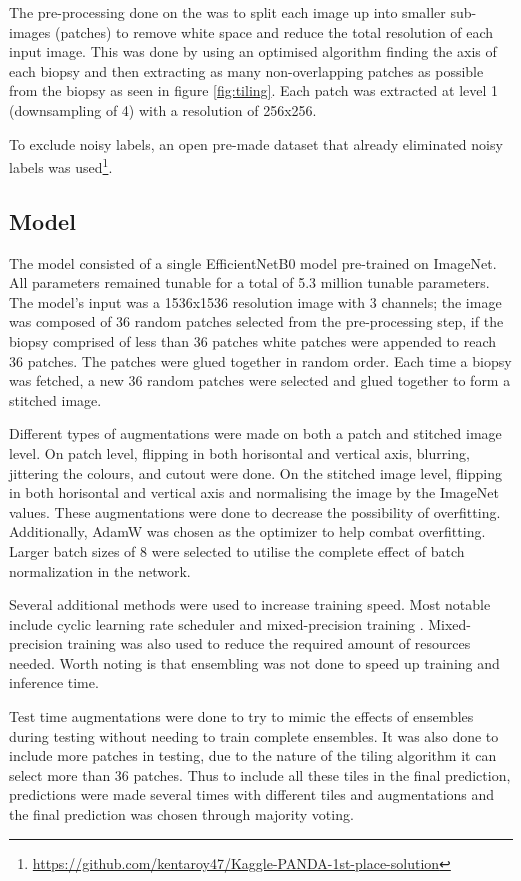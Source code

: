 \documentclass{mod-comjnl}
\begin{document}
The pre-processing done on the  was to split each image up into smaller sub-images (patches) to remove white space and reduce the total resolution of each input image. This was done by using an optimised algorithm finding the axis of each biopsy and then extracting as many non-overlapping patches as possible from the biopsy as seen in figure \ref{fig:tiling}. Each patch was extracted at level 1 (downsampling of 4) with a resolution of 256x256.

To exclude noisy labels, an open pre-made dataset that already eliminated noisy labels was used\footnote{\url{https://github.com/kentaroy47/Kaggle-PANDA-1st-place-solution}}.

\subsection{Model}
The model consisted of a single EfficientNetB0 model \cite{tan_efficientnet_2020} pre-trained on ImageNet. All parameters remained tunable for a total of 5.3 million tunable parameters. The model's input was a 1536x1536 resolution image with 3 channels; the image was composed of 36 random patches selected from the pre-processing step, if the biopsy comprised of less than 36 patches white patches were appended to reach 36 patches. The patches were glued together in random order. Each time a biopsy was fetched, a new 36 random patches were selected and glued together to form a stitched image.

Different types of augmentations were made on both a patch and stitched image level. On patch level, flipping in both horisontal and vertical axis, blurring, jittering the colours, and cutout were done. On the stitched image level, flipping in both horisontal and vertical axis and normalising the image by the ImageNet values. These augmentations were done to decrease the possibility of overfitting. Additionally, AdamW was chosen as the optimizer to help combat overfitting. Larger batch sizes of 8 were selected to utilise the complete effect of batch normalization in the network.

Several additional methods were used to increase training speed. Most notable include cyclic learning rate scheduler \cite{smith_cyclical_2017} and mixed-precision training \cite{micikevicius_mixed_2018}. Mixed-precision training was also used to reduce the required amount of resources needed. Worth noting is that ensembling was not done to speed up training and inference time.

Test time augmentations were done to try to mimic the effects of ensembles during testing without needing to train complete ensembles. It was also done to include more patches in testing, due to the nature of the tiling algorithm it can select more than 36 patches. Thus to include all these tiles in the final prediction, predictions were made several times with different tiles and augmentations and the final prediction was chosen through majority voting.
\end{document}
